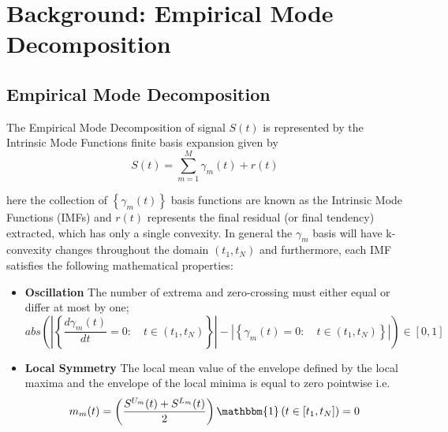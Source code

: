 \section{Background: Empirical Mode Decomposition}\label{sec:EMD_background}

\subsection{Empirical Mode Decomposition}

\begin{Definition}
The Empirical Mode Decomposition of signal $S(t)$ is represented by the Intrinsic Mode Functions finite basis expansion given by
\begin{equation}
\label{EMD-for}
S(t) = \sum_{m=1}^M \gamma_m \left(t\right) + r \left(t \right)
\end{equation}

here the collection of $\left\{\gamma_m(t)\right\}$ basis functions are known as the Intrinsic Mode Functions (IMFs) and $r \left(t \right)$ represents the final residual (or final tendency) extracted, which has only a single convexity. In general the $\gamma_m$ basis will have k-convexity changes throughout the domain $(t_1, t_N)$ and furthermore, each IMF satisfies the following mathematical properties:
\begin{itemize}
\item \textbf{Oscillation} The number of extrema and zero-crossing must either equal or differ at most by one;
\begin{equation}
abs \left( \left| \left\{ \frac{d \gamma_m (t)}{dt} = 0 : \quad t \in \left( t_1, t_N \right) \right\} \right| - \left| \left\{ \gamma_m (t) = 0 : \quad t \in \left( t_1, t_N \right) \right\} \right| \right)  \in  \left[ 0, 1 \right]
\end{equation}
\item \textbf{Local Symmetry} The local mean value of the envelope defined by the local maxima and the envelope of the local minima is equal to zero pointwise i.e.   
\begin{equation}
\label{mean_env}
m_m(t) = \left(\frac{S^{U_m} (t) + S^{L_m} (t)}{2} \right) \mathbbm{1} \left( t \in [t_1, t_N] \right) = 0
\end{equation}


\end{itemize}
\end{Definition}
